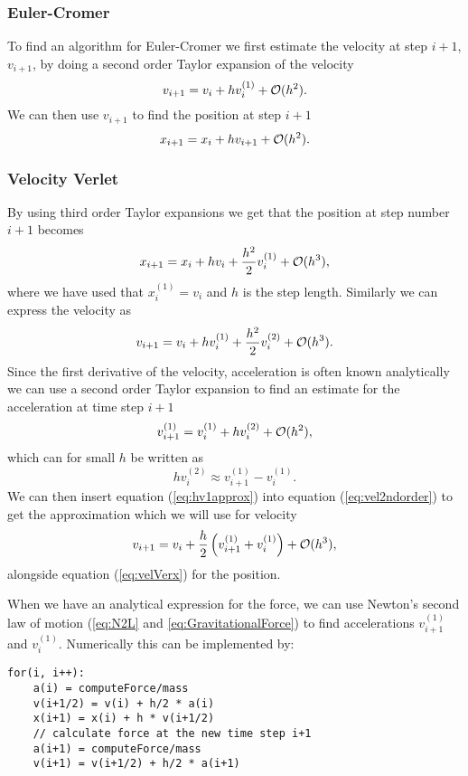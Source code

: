 \documentclass[norsk,a4paper,12pt]{article}
\begin{document}
{\subsubsection{Euler-Cromer}
To find an algorithm for Euler-Cromer we first estimate the velocity at step $i+1$, $v_{i+1}$, by doing a second order Taylor expansion of the velocity 
\begin{equation}
v_{i+1} = v_i + hv_i^{(1)} + {\cal O}(h^2). 
\label{eq:EulCrov}
\end{equation}
We can then use $v_{i+1}$ to find the position at step $i+1$
\begin{equation}
x_{i+1} = x_i + hv_{i+1} + {\cal O}(h^2).
\label{eq:EulCrox}
\end{equation}
\subsubsection{Velocity Verlet}
By using third order Taylor expansions we get that the position at step number $i+1$ becomes \begin{equation}
x_{i+1} = x_i + h v_i + \frac{h^2}{2}v_i^{(1)} + {\cal O}(h^3),
\label{eq:velVerx}
\end{equation}
where we have used that $x_i^{(1)} = v_i$ and $h$ is the step length. Similarly we can express the velocity as
\begin{equation}
v_{i+1} = v_i + h v_i^{(1)} + \frac{h^2}{2}v_i^{(2)} + {\cal O}(h^3).
\label{eq:vel2ndorder}
\end{equation}
Since the first derivative of the velocity, acceleration is often known analytically we can use a second order Taylor expansion to find an estimate for the acceleration at time step $i+1$
$$v_{i+1}^{(1)} = v_i^{(1)} + hv_i^{(2)} + {\cal O}(h^2), $$
which can for small $h$ be written as 
\begin{equation}
hv_i^{(2)} \approx v_{i+1}^{(1)}- v_i^{(1)}.
\label{eq:hv1approx}
\end{equation}
We can then insert equation (\ref{eq:hv1approx}) into equation (\ref{eq:vel2ndorder}) to get the approximation which we will use for velocity
\begin{equation}
v_{i+1} = v_i + \frac{h}{2}\left(v_{i+1}^{(1)} + v_i^{(1)}\right) + {\cal O}(h^3),
\label{eq:velVerv}
\end{equation}
alongside equation (\ref{eq:velVerx}) for the position. 

When we have an analytical expression for the force, we can use Newton's second law of motion (\ref{eq:N2L} and \ref{eq:GravitationalForce}) to find accelerations $v_{i+1}^{(1)}$ and $v_{i}^{(1)}$. Numerically this can be implemented by:
\begin{lstlisting}
for(i, i++):
	a(i) = computeForce/mass
	v(i+1/2) = v(i) + h/2 * a(i)
	x(i+1) = x(i) + h * v(i+1/2)
	// calculate force at the new time step i+1
	a(i+1) = computeForce/mass
	v(i+1) = v(i+1/2) + h/2 * a(i+1)
\end{lstlisting}
}
\end{document}
